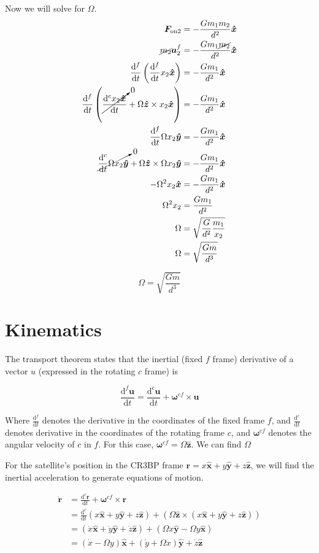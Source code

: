 \documentclass{article}
\newcommand{\dd}[2]{\frac{\mathrm{d}#1}{\mathrm{d}#2}}
\newcommand{\vv}[1]{\boldsymbol{#1}}
\newcommand{\vh}[1]{\boldsymbol{\hat{#1}}}
\begin{document}
Now we will solve for $\Omega$.
\[\begin{aligned}
    \vv{F_{\text{on2}}}&=-\frac{Gm_1m_2}{d^2}\vh{x}\\
    \cancel{m_2}\vv{a}_2^f&=-\frac{Gm_1\cancel{m_2}}{d^2}\vh{x}\\
    \dd{^f}{t}\left(\dd{^f}{t}x_2\vh{x}\right)&=-\frac{Gm_1}{d^2}\vh{x}\\
    \dd{^f}{t}\left(\cancelto{0}{\dd{^c x_2\vh{x}}{t}}+\Omega\vh{z}\times x_2\vh{x}\right)&=-\frac{Gm_1}{d^2}\vh{x}\\
    \dd{^f}{t}\Omega x_2\vh{y}&=-\frac{Gm_1}{d^2}\vh{x}\\
    \cancelto{0}{\dd{^c}{t}\Omega x_2 \vh{y}}+\Omega\vh{z}\times\Omega x_2\vh{y}&=-\frac{Gm_1}{d^2}\vh{x}\\
    -\Omega^2 x_2\vh{x}&=-\frac{Gm_1}{d^2}\vh{x}\\
    \Omega^2x_2&=\frac{Gm_1}{d^2}\\
    \Omega&=\sqrt{\frac{G}{d^2}\frac{m_1}{x_2}}\\
    \Omega&=\sqrt{\frac{Gm}{d^3}}\\
\end{aligned}\]

\[\boxed{\Omega=\sqrt{\frac{Gm}{d^3}}}\]

\section*{Kinematics}
The transport theorem states that the inertial (fixed $f$ frame) derivative of a vector $u$ (expressed in the rotating $c$ frame) is

\[\dd{^f \vv{u}}{t}=\dd{^c\vv{u}}{t}+\vv{\omega}^{cf}\times\vv{u}\]

Where $\dd{^f}{t}$ denotes the derivative in the coordinates of the fixed frame $f$, and $\dd{^c}{t}$ denotes derivative in the coordinates of the rotating frame $c$, and $\vv{\omega}^{cf}$ denotes the angular velocity of $c$ in $f$. For this case, $\vv{\omega}^{cf}=\Omega\vh{z}$. We can find $\Omega$

For the satellite's position in the CR3BP frame $\vv{r}=x\vh{x}+y\vh{y}+z\vh{z}$, we will find the inertial acceleration to generate equations of motion.

\[
\begin{aligned}
    \vv{\dot{r}}&=\dd{^c\vv{r}}{t}+\vv{\omega}^{cf}\times\vv{r}\\
    &=\dd{^c}{t}\left(x\vh{x}+y\vh{y}+z\vh{z}\right)+\left(\Omega\vh{z}\times\left(x\vh{x}+y\vh{y}+z\vh{z}\right)\right)\\
    &=\left(\dot{x}\vh{x}+\dot{y}\vh{y}+\dot{z}\vh{z}\right)+\left(\Omega x\vh{y}-\Omega y\vh{x}\right)\\
    &=\left(\dot{x}-\Omega y\right)\vh{x}+\left(\dot{y}+\Omega x\right)\vh{y}+\dot{z}\vh{z}
\end{aligned}
\]
\end{document}
